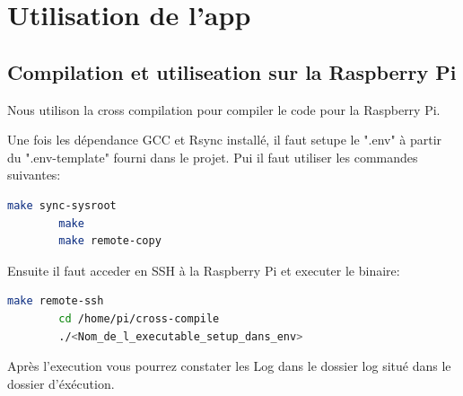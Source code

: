 \section{Utilisation de l'app}

\subsection{Compilation et utiliseation sur la Raspberry Pi}
    Nous utilison la cross compilation pour compiler le code pour la Raspberry Pi.
    
    Une fois les dépendance GCC et Rsync installé, il faut setupe le ".env" à partir du ".env-template" fourni dans le projet.
    Pui il faut utiliser les commandes suivantes:
    \begin{lstlisting}[language=bash]
        make sync-sysroot
        make 
        make remote-copy
    \end{lstlisting}

    Ensuite il faut acceder en SSH à la Raspberry Pi et executer le binaire:
    \begin{lstlisting}[language=bash]
        make remote-ssh
        cd /home/pi/cross-compile
        ./<Nom_de_l_executable_setup_dans_env>
    \end{lstlisting}

    Après l'execution vous pourrez constater les Log dans le dossier log situé dans le dossier d'éxécution.